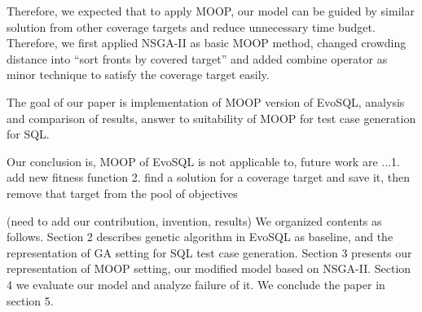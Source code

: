  Therefore, we expected that to apply MOOP, our model can be guided by similar solution from other coverage targets and reduce unnecessary time budget. Therefore, we first applied NSGA-II as basic MOOP method, changed crowding distance into ``sort fronts by covered target'' and added combine operator as minor technique to satisfy the coverage target easily. 

The goal of our paper is implementation of MOOP version of EvoSQL, analysis and comparison of results, answer to suitability of MOOP for test case generation for SQL. 

Our conclusion is, MOOP of EvoSQL is not applicable to, 
future work are ...1. add new fitness function
2. find a solution for a coverage target and save it, then remove that target from the pool of objectives

(need to add our contribution, invention, results)
We organized contents as follows. Section 2 describes genetic algorithm in EvoSQL as baseline, and the representation of GA setting for SQL test case generation. Section 3 presents our representation of MOOP setting, our modified model based on NSGA-II. Section 4 we evaluate our model and analyze failure of it. We conclude the paper in section 5.
